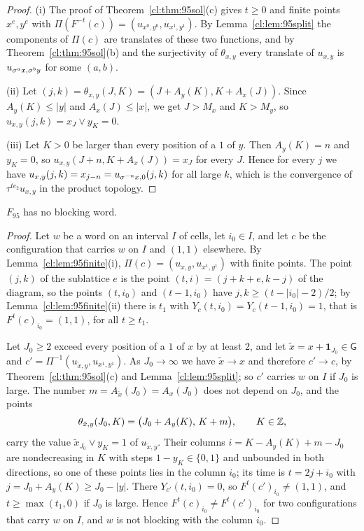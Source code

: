 \begin{proof}
(i) The proof of Theorem~\ref{cl:thm:95sol}(c) gives $t\ge0$ and finite points $x^e,y^e$ with $\Pi(F^{-t}(c))=(u_{x^0,y^0},u_{x^1,y^1})$. By Lemma~\ref{cl:lem:95split} the components of $\Pi(c)$ are translates of these two functions, and by Theorem~\ref{cl:thm:95sol}(b) and the surjectivity of $\theta_{x,y}$ every translate of $u_{x,y}$ is $u_{\sigma^ax,\sigma^by}$ for some $(a,b)$.

(ii) Let $(j,k)=\theta_{x,y}(J,K)=(J+A_y(K),K+A_x(J))$. Since $A_y(K)\le|y|$ and $A_x(J)\le|x|$, we get $J>M_x$ and $K>M_y$, so $u_{x,y}(j,k)=x_J\vee y_K=0$.

(iii) Let $K>0$ be larger than every position of a $1$ of $y$. Then $A_y(K)=n$ and $y_K=0$, so $u_{x,y}(J+n,K+A_x(J))=x_J$ for every $J$. Hence for every $j$ we have $u_{x,y}(j,k)=x_{j-n}=u_{\sigma^{-n}x,0}(j,k)$ for all large $k$, which is the convergence of $\tau^{te_2}u_{x,y}$ in the product topology.
\end{proof}

\begin{proposition}\label{cl:prop:95noblock}
$F_{95}$ has no blocking word.
\end{proposition}

\begin{proof}
Let $w$ be a word on an interval $I$ of cells, let $i_0\in I$, and let $c$ be the configuration that carries $w$ on $I$ and $(1,1)$ elsewhere. By Lemma~\ref{cl:lem:95finite}(i), $\Pi(c)=(u_{x,y},u_{x^1,y^1})$ with finite points. The point $(j,k)$ of the sublattice $e$ is the point $(t,i)=(j+k+e,k-j)$ of the diagram, so the points $(t,i_0)$ and $(t-1,i_0)$ have $j,k\ge(t-|i_0|-2)/2$; by Lemma~\ref{cl:lem:95finite}(ii) there is $t_1$ with $Y_c(t,i_0)=Y_c(t-1,i_0)=1$, that is $F^t(c)_{i_0}=(1,1)$, for all $t\ge t_1$.

Let $J_0\ge2$ exceed every position of a $1$ of $x$ by at least $2$, and let $\tilde x=x+\mathbf 1_{J_0}\in\mathsf G$ and $c'=\Pi^{-1}(u_{\tilde x,y},u_{x^1,y^1})$. As $J_0\to\infty$ we have $\tilde x\to x$ and therefore $c'\to c$, by Theorem~\ref{cl:thm:95sol}(c) and Lemma~\ref{cl:lem:95split}; so $c'$ carries $w$ on $I$ if $J_0$ is large. The number $m=A_{\tilde x}(J_0)=A_x(J_0)$ does not depend on $J_0$, and the points
\[
\theta_{\tilde x,y}(J_0,K)=\bigl(J_0+A_y(K),\,K+m\bigr),\qquad K\in\mathbb{Z},
\]
carry the value $\tilde x_{J_0}\vee y_K=1$ of $u_{\tilde x,y}$. Their columns $i=K-A_y(K)+m-J_0$ are nondecreasing in $K$ with steps $1-y_K\in\{0,1\}$ and unbounded in both directions, so one of these points lies in the column $i_0$; its time is $t=2j+i_0$ with $j=J_0+A_y(K)\ge J_0-|y|$. There $Y_{c'}(t,i_0)=0$, so $F^t(c')_{i_0}\ne(1,1)$, and $t\ge\max(t_1,0)$ if $J_0$ is large. Hence $F^t(c)_{i_0}\ne F^t(c')_{i_0}$ for two configurations that carry $w$ on $I$, and $w$ is not blocking with the column $i_0$.
\end{proof}

